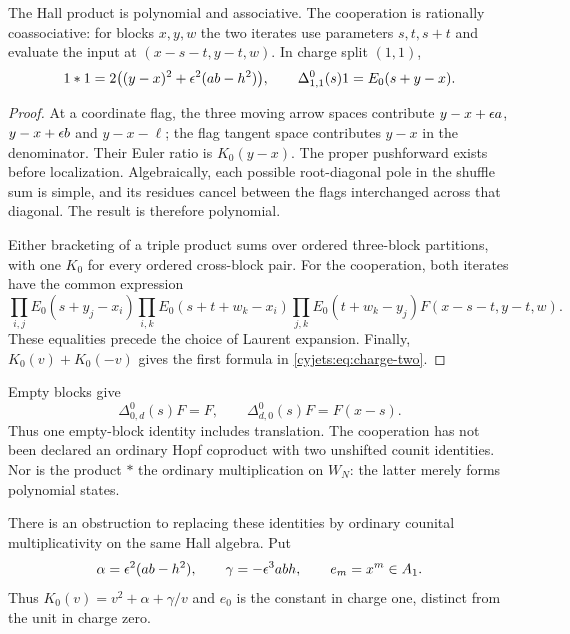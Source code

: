 \begin{proposition}\label{cyjets:prop:hall}
The Hall product is polynomial and associative. The cooperation is
rationally coassociative: for blocks $x,y,w$ the two iterates use
parameters $s,t,s+t$ and evaluate the input at
$(x-s-t,y-t,w)$. In charge split $(1,1)$,
\begin{equation}\label{cyjets:eq:charge-two}
 1*1=2\bigl((y-x)^2+\epsilon^2(ab-h^2)\bigr),\qquad
 \Delta^0_{1,1}(s)1=E_0(s+y-x).
\end{equation}
\end{proposition}
\begin{proof}
At a coordinate flag, the three moving arrow spaces contribute
$y-x+\epsilon a$, $y-x+\epsilon b$ and $y-x-\ell$; the flag tangent
space contributes $y-x$ in the denominator. Their Euler ratio is
$K_0(y-x)$. The proper pushforward exists before localization.
Algebraically, each possible root-diagonal pole in the shuffle sum
is simple, and its residues cancel between the flags interchanged
across that diagonal. The result is therefore polynomial.

Either bracketing of a triple product sums over ordered three-block
partitions, with one $K_0$ for every ordered cross-block pair. For
the cooperation, both iterates have the common expression
\[
 \prod_{i,j}E_0(s+y_j-x_i)
 \prod_{i,k}E_0(s+t+w_k-x_i)
 \prod_{j,k}E_0(t+w_k-y_j)
 F(x-s-t,y-t,w).
\]
These equalities precede the choice of Laurent expansion. Finally,
$K_0(v)+K_0(-v)$ gives the first formula in
\eqref{cyjets:eq:charge-two}.
\end{proof}

Empty blocks give
\[
 \Delta^0_{0,d}(s)F=F,\qquad
 \Delta^0_{d,0}(s)F=F(x-s).
\]
Thus one empty-block identity includes translation. The cooperation
has not been declared an ordinary Hopf coproduct with two unshifted
counit identities. Nor is the product $*$ the ordinary multiplication
on $W_N$: the latter merely forms polynomial states.

There is an obstruction to replacing these identities by ordinary
counital multiplicativity on the same Hall algebra. Put
\[
 \alpha=\epsilon^2(ab-h^2),\qquad \gamma=-\epsilon^3abh,
 \qquad e_m=x^m\in A_1.
\]
Thus $K_0(v)=v^2+\alpha+\gamma/v$ and $e_0$ is the constant
in charge one, distinct from the unit in charge zero.

